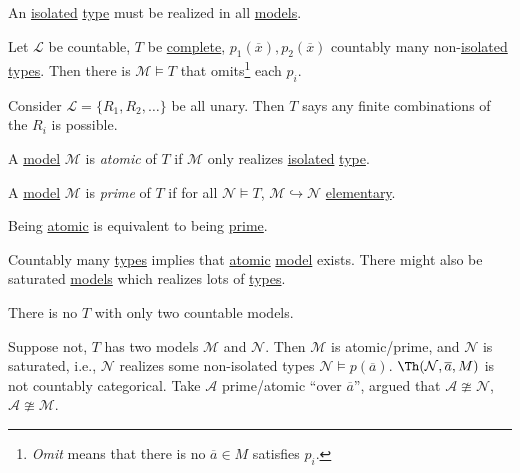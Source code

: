 An \hyperref[def:isolated]{isolated} \hyperref[def:type]{type} must be realized in all \hyperref[def:model]{models}.

\begin{theorem}\label{thm:omitting-types}
	Let \(\mathcal{L} \) be countable, \(T\) be \hyperref[def:theory-complete]{complete}, \(p_1(\overline{x} ), p_2(\overline{x} )\) countably many non-\hyperref[def:isolated]{isolated} \hyperref[def:type]{types}. Then there is \(\mathcal{M} \models T\) that omits\footnote{\emph{Omit} means that there is no \(\overline{a} \in M\) satisfies \(p_i\).} each \(p_i\).
\end{theorem}

\begin{eg}
	Consider \(\mathcal{L} = \{ R_1, R_2, \dots \} \) be all unary. Then \(T\) says any finite combinations of the \(R_i\) is possible.
\end{eg}

\begin{definition}[Atomic]\label{def:atomic}
	A \hyperref[def:model]{model} \(\mathcal{M} \) is \emph{atomic} of \(T\) if \(\mathcal{M} \) only realizes \hyperref[def:isolated]{isolated} \hyperref[def:type]{type}.
\end{definition}

\begin{definition}[Prime]\label{def:prime}
	A \hyperref[def:model]{model} \(\mathcal{M} \) is \emph{prime} of \(T\) if for all \(\mathcal{N} \models T\), \(\mathcal{M} \hookrightarrow \mathcal{N} \) \hyperref[def:elementary-embedding]{elementary}.
\end{definition}

\begin{theorem}
	Being \hyperref[def:atomic]{atomic} is equivalent to being \hyperref[def:prime]{prime}.
\end{theorem}

Countably many \hyperref[def:type]{types} implies that \hyperref[def:atomic]{atomic} \hyperref[def:model]{model} exists. There might also be saturated \hyperref[def:model]{models} which realizes lots of \hyperref[def:type]{types}.

\begin{remark}
	There is no \(T\) with only two countable models.
\end{remark}
\begin{explanation}
	Suppose not, \(T\) has two models \(\mathcal{M} \) and \(\mathcal{N} \). Then \(\mathcal{M} \) is atomic/prime, and \(\mathcal{N} \) is saturated, i.e., \(\mathcal{N} \) realizes some non-isolated types \(\mathcal{N} \models p(\overline{a} )\). \(\Th(\mathcal{N} , \overline{a} , M) \) is not countably categorical. Take \(\mathcal{A} \) prime/atomic ``over \(\overline{a} \)'', argued that \(\mathcal{A} \ncong \mathcal{N} \), \(\mathcal{A} \ncong \mathcal{M} \).
\end{explanation}